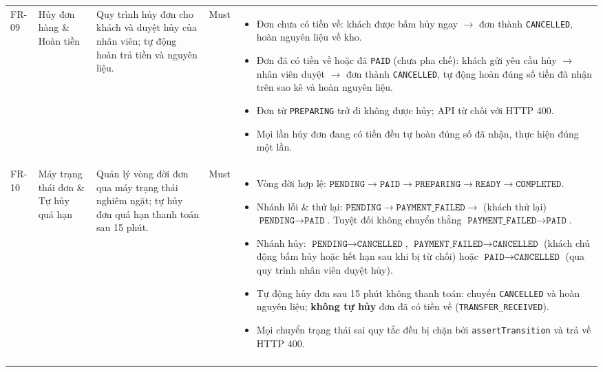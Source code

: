 \begin{longtable}{@{}p{1.2cm}p{2.6cm}p{4.2cm}p{1.4cm}p{6.6cm}@{}}
FR-09 & Hủy đơn hàng \& Hoàn tiền
  & Quy trình hủy đơn cho khách và duyệt hủy của nhân viên; tự động hoàn trả tiền và nguyên liệu.
  & Must
  & \begin{itemize}[leftmargin=*]
      \item Đơn chưa có tiền về: khách được bấm hủy ngay $\rightarrow$ đơn thành \texttt{CANCELLED}, hoàn nguyên liệu về kho.
      \item Đơn đã có tiền về hoặc đã \texttt{PAID} (chưa pha chế): khách gửi yêu cầu hủy $\rightarrow$ nhân viên duyệt $\rightarrow$ đơn thành \texttt{CANCELLED}, tự động hoàn đúng số tiền đã nhận trên sao kê và hoàn nguyên liệu.
      \item Đơn từ \texttt{PREPARING} trở đi không được hủy; API từ chối với HTTP 400.
      \item Mọi lần hủy đơn đang có tiền đều tự hoàn đúng số đã nhận, thực hiện đúng một lần.
    \end{itemize} \\
\addlinespace

FR-10 & Máy trạng thái đơn \& Tự hủy quá hạn
  & Quản lý vòng đời đơn qua máy trạng thái nghiêm ngặt; tự hủy đơn quá hạn thanh toán sau 15 phút.
  & Must
  & \begin{itemize}[leftmargin=*]
      \item Vòng đời hợp lệ: $\texttt{PENDING} \rightarrow \texttt{PAID} \rightarrow \texttt{PREPARING} \rightarrow \texttt{READY} \rightarrow \texttt{COMPLETED}$.
      \item Nhánh lỗi \& thử lại: $\texttt{PENDING} \rightarrow \texttt{PAYMENT\_FAILED} \rightarrow$ (khách thử lại) $\texttt{PENDING} \rightarrow \texttt{PAID}$. Tuyệt đối không chuyển thẳng $\texttt{PAYMENT\_FAILED} \rightarrow \texttt{PAID}$.
      \item Nhánh hủy: $\texttt{PENDING} \rightarrow \texttt{CANCELLED}$, $\texttt{PAYMENT\_FAILED} \rightarrow \texttt{CANCELLED}$ (khách chủ động bấm hủy hoặc hết hạn sau khi bị từ chối) hoặc $\texttt{PAID} \rightarrow \texttt{CANCELLED}$ (qua quy trình nhân viên duyệt hủy).
      \item Tự động hủy đơn sau 15 phút không thanh toán: chuyển \texttt{CANCELLED} và hoàn nguyên liệu; \textbf{không tự hủy} đơn đã có tiền về (\texttt{TRANSFER\_RECEIVED}).
      \item Mọi chuyển trạng thái sai quy tắc đều bị chặn bởi \texttt{assertTransition} và trả về HTTP 400.
    \end{itemize} \\
\addlinespace


\end{longtable}
